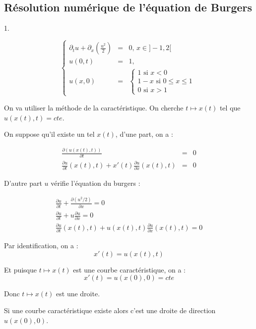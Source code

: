 \documentclass{article}
\begin{document}
\subsection{Résolution numérique de l’équation de Burgers}

1. 

\[ \left\{ \begin{matrix}
	\partial_t u + \partial_x(\frac{u^2}{2}) &=& 0 \textbf{, } x \in ]-1,2[ \\
	u(0,t) &=& 1, \\
	u(x,0) &=& \left\{ \begin{matrix}
		1 \text{ si } x<0 \\
		1-x \text{ si } 0\leq x \leq 1 \\
		0 \text{ si } x>1	
	\end{matrix} \right.
\end{matrix} \right.
\label{eq3} \tag{Burgers1}
\]

On va utiliser la méthode de la caractéristique. On cherche $t \longmapsto x(t)$ tel que $u(x(t),t) = cte$.

On suppose qu'il existe un tel $x(t)$, d'une part, on a :

\begin{eqnarray*}
	\frac{\partial (u(x(t),t))}{\partial t} &=& 0 \\
	\frac{\partial u}{\partial t}(x(t),t) + x'(t) \frac{\partial u}{\partial x}(x(t),t) &=& 0
\end{eqnarray*}

D'autre part $u$ vérifie l'équation du burgers :

\begin{eqnarray*}
	\frac{\partial u}{\partial t} + \frac{\partial (u^2/2)}{\partial x} = 0 \\
	\frac{\partial u}{\partial t} + u \frac{\partial u}{\partial x} = 0 \\
	\frac{\partial u}{\partial t}(x(t),t) + u(x(t),t) \frac{\partial u}{\partial x}(x(t),t) = 0 
\end{eqnarray*}

Par identification, on a :
\[ x'(t) = u(x(t),t) \]

Et puisque $t \longmapsto x(t)$ est une courbe caractéristique, on a :
\[x'(t) = u(x(0),0) = cte\]

Donc $t \longmapsto x(t)$ est une droite.

Si une courbe caractéristique existe alors c'est une droite de direction $u(x(0),0)$.
\newline
\end{document}
